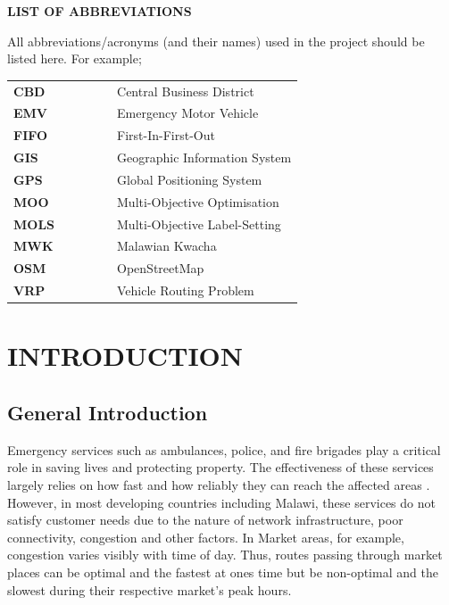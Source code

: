 \documentclass[paper=A4, 12pt, mathscr]{report}
\begin{document}

	\newpage
	\setcounter{tocdepth}{2}
	\tableofcontents%
	\newpage
	\renewcommand*\listtablename{LIST OF TABLES}
	\listoftables {}
	\newpage
	\renewcommand*\listfigurename{LIST OF FIGURES} 
	\listoffigures {}
	\newpage
	\begin{center}
		{\bf\large \scshape LIST OF ABBREVIATIONS} \vskip 30pt
	\end{center}
	All abbreviations/acronyms (and their names) used in the project should be listed here. For example;\\
	
	\begin{tabular}{llllll}
		{\bf CBD}    &&&&& Central Business District\\
		{\bf EMV}    &&&&& Emergency Motor Vehicle\\
		{\bf FIFO}   &&&&& First-In-First-Out\\
		{\bf GIS}    &&&&& Geographic Information System\\
		{\bf GPS}    &&&&& Global Positioning System\\
		{\bf MOO}    &&&&& Multi-Objective Optimisation\\
		{\bf MOLS}   &&&&& Multi-Objective Label-Setting\\
		{\bf MWK}    &&&&& Malawian Kwacha\\
		{\bf OSM}    &&&&& OpenStreetMap\\
		{\bf VRP}    &&&&& Vehicle Routing Problem
	\end{tabular}
	
	\newpage
	\chapter{INTRODUCTION}
	\section{General Introduction}
	Emergency services such as ambulances, police, and fire brigades play a critical role in saving lives and protecting property. The effectiveness of these services largely relies on how fast and how reliably they can reach the affected areas \cite{10}. However, in most developing countries including Malawi, these services do not satisfy customer needs due to the nature of network infrastructure, poor connectivity, congestion and other factors. In Market areas, for example, congestion varies visibly with time of day. Thus, routes passing through market places can be optimal and the fastest at ones time but be non-optimal and the slowest during their respective market's peak hours.
	
\end{document}
